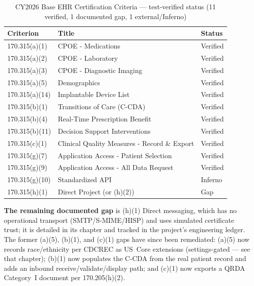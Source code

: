 \begin{table}[h]
\centering
\begin{tabular}{lll}
\toprule
\textbf{Criterion} & \textbf{Title} & \textbf{Status} \\
\midrule
\textsection{} 170.315(a)(1) & CPOE - Medications & Verified \\
\textsection{} 170.315(a)(2) & CPOE - Laboratory & Verified \\
\textsection{} 170.315(a)(3) & CPOE - Diagnostic Imaging & Verified \\
\textsection{} 170.315(a)(5) & Demographics & Verified \\
\textsection{} 170.315(a)(14) & Implantable Device List & Verified \\
\textsection{} 170.315(b)(1) & Transitions of Care (C-CDA) & Verified \\
\textsection{} 170.315(b)(4) & Real-Time Prescription Benefit & Verified \\
\textsection{} 170.315(b)(11) & Decision Support Interventions & Verified \\
\textsection{} 170.315(c)(1) & Clinical Quality Measures - Record \& Export & Verified \\
\textsection{} 170.315(g)(7) & Application Access - Patient Selection & Verified \\
\textsection{} 170.315(g)(9) & Application Access - All Data Request & Verified \\
\textsection{} 170.315(g)(10) & Standardized API & Inferno \\
\textsection{} 170.315(h)(1) & Direct Project (or (h)(2)) & Gap \\
\bottomrule
\end{tabular}
\caption{CY2026 Base EHR Certification Criteria --- test-verified status (11 verified, 1 documented gap, 1 external/Inferno)}
\end{table}

\textbf{The remaining documented gap} is (h)(1) Direct messaging, which has no operational transport (SMTP/S-MIME/HISP) and uses simulated certificate trust; it is detailed in its chapter and tracked in the project's engineering ledger. The former (a)(5), (b)(1), and (c)(1) gaps have since been remediated: (a)(5) now records race/ethnicity per CDCREC as US~Core extensions (settings-gated --- see that chapter); (b)(1) now populates the C-CDA from the real patient record and adds an inbound receive/validate/display path; and (c)(1) now exports a QRDA Category~I document per \textsection{} 170.205(h)(2).


